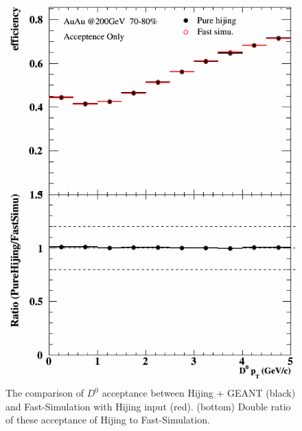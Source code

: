 \documentclass[a4paper]{article}
\begin{document}
\begin{figure}[htbp]
\begin{minipage}[htbp]{0.47\linewidth}
\centering
\includegraphics[width=1.0\textwidth,angle=0]{fig/70_80_0.png}
\caption{ The comparison of $D^0$ acceptance between Hijing + GEANT (black) and Fast-Simulation with Hijing input (red). (bottom) Double ratio of these acceptance of Hijing to Fast-Simulation.\label{70_80_0}}
\end{minipage}
\hfill
\begin{minipage}[htbp]{0.47\linewidth}
\centering

\end{minipage}
\end{figure}
\end{document}
